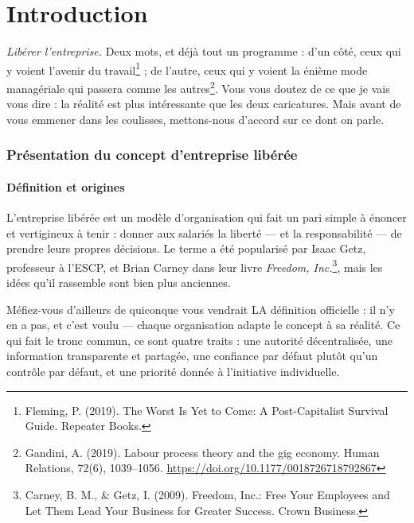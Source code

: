 

\part*{Introduction}

\textit{Libérer l'entreprise.} Deux mots, et déjà tout un programme : d'un côté, ceux qui y voient l'avenir du travail\footnote{Fleming, P. (2019). The Worst Is Yet to Come: A Post-Capitalist Survival Guide. Repeater Books.} ; de l'autre, ceux qui y voient la énième mode managériale qui passera comme les autres\footnote{Gandini, A. (2019). Labour process theory and the gig economy. Human Relations, 72(6), 1039–1056. \url{https://doi.org/10.1177/0018726718792867}}. Vous vous doutez de ce que je vais vous dire : la réalité est plus intéressante que les deux caricatures. Mais avant de vous emmener dans les coulisses, mettons-nous d'accord sur ce dont on parle.

\section*{Présentation du concept d'entreprise libérée}

\subsection*{Définition et origines}

L'entreprise libérée est un modèle d'organisation qui fait un pari simple à énoncer et vertigineux à tenir : donner aux salariés la liberté — et la responsabilité — de prendre leurs propres décisions. Le terme a été popularisé par Isaac Getz, professeur à l'ESCP, et Brian Carney dans leur livre \textit{Freedom, Inc.}\footnote{Carney, B. M., \& Getz, I. (2009). Freedom, Inc.: Free Your Employees and Let Them Lead Your Business for Greater Success. Crown Business.}, mais les idées qu'il rassemble sont bien plus anciennes.

Méfiez-vous d'ailleurs de quiconque vous vendrait LA définition officielle : il n'y en a pas, et c'est voulu — chaque organisation adapte le concept à sa réalité. Ce qui fait le tronc commun, ce sont quatre traits : une autorité décentralisée, une information transparente et partagée, une confiance par défaut plutôt qu'un contrôle par défaut, et une priorité donnée à l'initiative individuelle.

